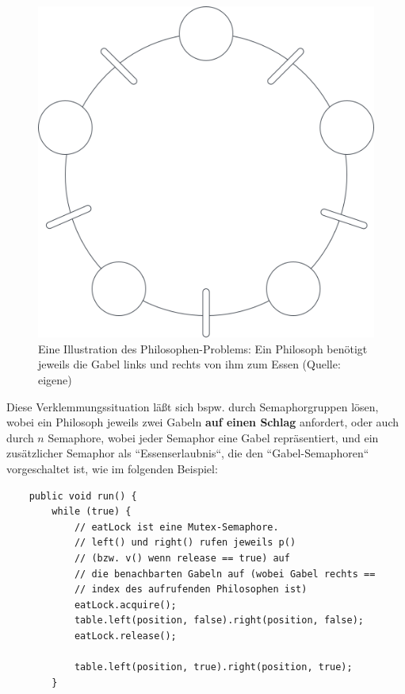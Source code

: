 \begin{figure}
    \centering
    \includegraphics[scale=0.25]{chapters/fopt2/img/philosopher}
    \caption{ Eine Illustration des Philosophen-Problems: Ein Philosoph benötigt jeweils die Gabel links und rechts von ihm zum Essen (Quelle: eigene)}
    \label{fig:philosopher}
\end{figure}

\noindent
Diese Verklemmungssituation läßt sich bspw. durch Semaphorgruppen lösen, wobei ein Philosoph jeweils zwei Gabeln \textbf{auf einen Schlag} anfordert, oder auch durch $n$ Semaphore, wobei jeder Semaphor eine Gabel repräsentiert, und ein zusätzlicher Semaphor als ``Essenserlaubnis``, die den ``Gabel-Semaphoren`` vorgeschaltet ist, wie im folgenden Beispiel:

\begin{verbatim}
    public void run() {
        while (true) {
            // eatLock ist eine Mutex-Semaphore.
            // left() und right() rufen jeweils p()
            // (bzw. v() wenn release == true) auf
            // die benachbarten Gabeln auf (wobei Gabel rechts ==
            // index des aufrufenden Philosophen ist)
            eatLock.acquire();
            table.left(position, false).right(position, false);
            eatLock.release();

            table.left(position, true).right(position, true);
        }
\end{verbatim}\\



